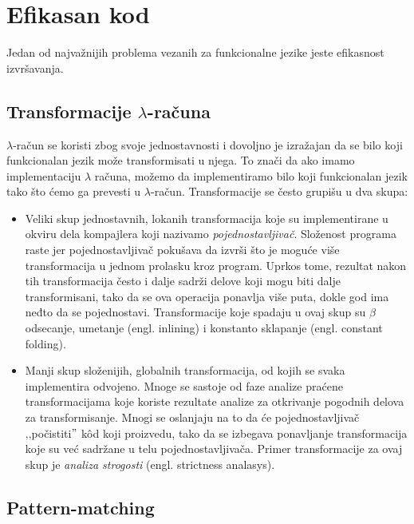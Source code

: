 \section{Efikasan kod}


Jedan od najvažnijih problema vezanih za funkcionalne jezike jeste efikasnost izvršavanja. 
	

\subsection{Transformacije $\lambda$-računa}

$\lambda$-račun se koristi zbog svoje jednostavnosti i dovoljno je izražajan da se bilo koji funkcionalan jezik može transformisati u njega. To znači da ako imamo implementaciju $\lambda$ računa, možemo da implementiramo  bilo koji funkcionalan jezik tako što ćemo ga prevesti u $\lambda$-račun. Transformacije se često grupišu u dva skupa:


\begin{itemize}
	\item Veliki skup jednostavnih, lokanih transformacija koje su implementirane u okviru dela kompajlera koji nazivamo \textit{pojednostavljivač}. Složenost programa raste jer pojednostavljivač pokušava da izvrši što je moguće više transformacija u jednom prolasku kroz program. Uprkos tome, rezultat nakon tih transformacija često i dalje sadrži delove koji mogu biti dalje transformisani, tako da se ova operacija ponavlja više puta, dokle god ima neđto da se pojednostavi. Transformacije koje spadaju u ovaj skup su $\beta$ odsecanje, umetanje (engl. inlining) i konstanto sklapanje (engl. constant folding).
	
	\item Manji skup složenijih, globalnih transformacija, od kojih se svaka implementira odvojeno. Mnoge se sastoje od faze analize praćene transformacijama koje koriste rezultate analize za otkrivanje pogodnih delova za transformisanje. Mnogi se oslanjaju na to da će pojednostavljivač ‚‚počistiti$"$ k\^ od koji proizvedu, tako da se izbegava ponavljanje transformacija koje su već sadržane u telu pojednostavljivača. Primer transformacije za ovaj skup je  \textit{analiza strogosti} (engl. strictness analasys). 
	
\end{itemize}
  

\subsection{Pattern-matching}


